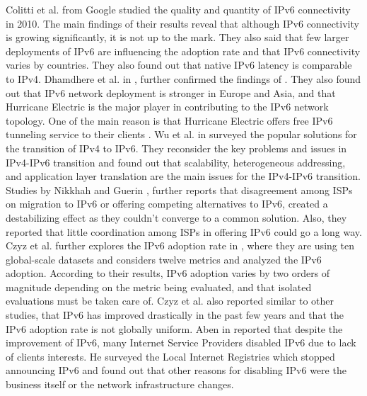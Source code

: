Colitti et al. from Google \cite{colittiipv6} studied the quality and quantity of IPv6 connectivity in 2010. The main findings of their results reveal that although IPv6 connectivity is growing significantly,
it is not up to the mark. They also said that few larger deployments of IPv6 are influencing the adoption rate and that IPv6 connectivity varies by countries. They also found out that native IPv6 latency is
comparable to IPv4. Dhamdhere et al. in \cite{dhamdhereipv6}, further confirmed the findings of \cite{colittiipv6}. They also found out that IPv6 network deployment is stronger in Europe and Asia, and that Hurricane Electric is the major player in contributing
to the IPv6 network topology. One of the main reason is that Hurricane Electric offers free IPv6 tunneling service to their clients \cite{tunnelbroker}. Wu et al. in \cite{ipv6transition} surveyed
the popular solutions for the transition of IPv4 to IPv6. They reconsider the key problems and issues in IPv4-IPv6 transition and found out that scalability, heterogeneous addressing, and application layer translation are the main issues for the IPv4-IPv6 transition.
Studies by Nikkhah and Guerin \cite{mehdicoordination} \cite{mehdiprogress}, further reports that disagreement among ISPs on migration to IPv6 or offering competing alternatives to IPv6, created a destabilizing effect as they couldn't converge to a common solution.
Also, they reported that little coordination among ISPs in offering IPv6 could go a long way.  Czyz et al. further explores the IPv6 adoption rate in \cite{jakubipv6}, where they are using ten global-scale datasets and considers twelve metrics
and analyzed the IPv6 adoption. According to their results, IPv6 adoption varies by two orders of magnitude depending on the metric being evaluated, and that isolated evaluations must be taken care of. Czyz et al. \cite{jakubipv6} also reported similar to other studies, 
that IPv6 has improved drastically in the past few years and that the IPv6 adoption rate is not globally uniform. Aben in \cite{loststars} reported that despite the improvement of IPv6, many Internet Service Providers disabled IPv6 due to lack of clients interests.
He surveyed the Local Internet Registries which stopped announcing IPv6 and found out that other reasons for disabling IPv6 were the business itself or the network infrastructure changes.


